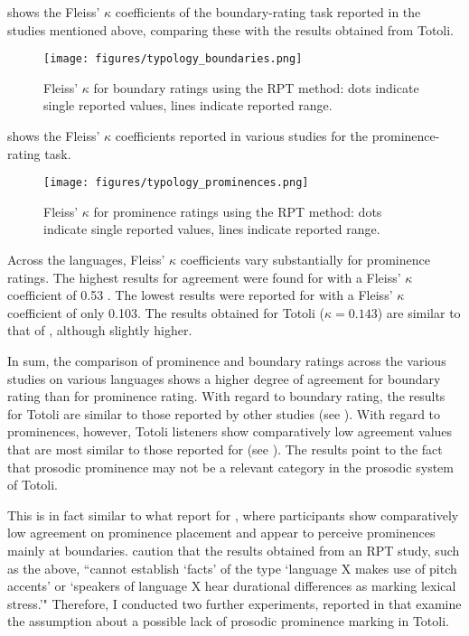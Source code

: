 \newpage
{} shows the Fleiss’ $\kappa$ coefficients of the boundary-rating task reported in the studies mentioned above, comparing these with the results obtained from Totoli. 


\begin{figure}
	\texttt{[image: figures/typology\_boundaries.png]}
	\caption{Fleiss’ $\kappa$ for boundary ratings using the RPT method: dots indicate single reported values, lines indicate reported range.}
	\label{Kappa comparison b}
\end{figure}



  shows the Fleiss’ $\kappa$ coefficients reported in  various studies for the prominence-rating task.




\begin{figure}
	\texttt{[image: figures/typology\_prominences.png]}
	\caption{Fleiss’ $\kappa$ for prominence ratings using the RPT method: dots indicate single reported values, lines indicate reported range.}
	\label{Kappa comparison p}
\end{figure}


Across the languages, Fleiss’ $\kappa$ coefficients vary substantially for prominence ratings.  The highest results for agreement were found for  with a Fleiss’ $\kappa$ coefficient of 0.53   \citep{Baumann_2018}. The lowest results were reported for   \citep{riesberg2018perception, riesberg2020} with a Fleiss’ $\kappa$ coefficient of only 0.103. The results obtained for Totoli ($\kappa = 0.143$) are similar to that of , although slightly higher.


In sum, the comparison  of prominence and boundary ratings across the various studies on various languages shows a higher degree of agreement for boundary rating than for prominence rating. With regard to boundary rating, the results for Totoli are similar to those reported by other studies (see  ). With regard to prominences, however, Totoli listeners show comparatively low agreement values that are most similar to those reported for  (see  ).  The results point to the fact that prosodic prominence may not be a relevant category in the prosodic system of Totoli. 

This is in fact similar to what \citet{riesberg2018perception} report for , where participants show comparatively low agreement on prominence placement and appear to perceive prominences mainly at boundaries.  \citet[2]{riesberg2020} caution that the results obtained from an RPT study, such as the above, ``cannot establish ‘facts’ of the type ‘language X makes use of pitch accents’ or ‘speakers of language X hear durational differences as marking lexical stress.’" Therefore, I conducted two further experiments, reported in  that  examine the  assumption about a possible lack of prosodic prominence marking in Totoli.

